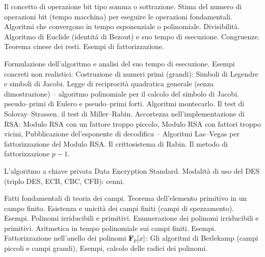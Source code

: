      
\def\abbrcorso{MA2}  
\def\titolocorso{Matematica Applicata: Laboratorio 2}
\def\sottotitolo{Crittografia a chiave pubblica} 
\def\docente{Prof. Francesco Pappalardi}  
\def\crediti{7.5}   
\def\semestre{II}
\def\esoneri{1}
\def\scrittofinale{1}
\def\oralefinale{0}
\def\altreprove{1}

\Intestazione   


Il concetto di operazione bit tipo somma o sottrazione. Stima 
del numero di operazioni bit (tempo macchina) per eseguire 
le operazioni fondamentali. Algoritmi che convergono in tempo 
esponenziale o polinomiale. Divisibilit\`a. Algoritmo di Euclide
(identit\'a di Bezout) e suo tempo di esecuzione. Congruenze. 
Teorema cinese dei resti. Esempi di fattorizzazione.


Formulazione dell'algoritmo e analisi del suo tempo di esecuzione.
Esempi concreti non realistici. Costruzione di numeri primi (grandi):
Simboli di Legendre e simboli di Jacobi.
Legge di reciprocit\`{a} quadratica generale (senza dimostrazione) --
algoritmo polinomiale per il calcolo del simbolo di Jacobi. 
pseudo--primi di Eulero e pseudo--primi forti.
Algoritmi montecarlo. Il test di Solovay--Strassen. il test di
Miller--Rabin. 
Accortezza nell'implementazione di RSA: Modulo RSA con un
fattore troppo piccolo, Modulo RSA con fattori troppo vicini,
Pubblicazione del'esponente di decodifica -- Algoritmi Las--Vegas
per fattorizzazione del Modulo RSA. Il crittosistema di Rabin.
Il metodo di fattorizzazione $p-1$.


L'algoritmo a chiave privata Data Encryption Standard. 
Modalit\`a di uso del DES (triplo DES, ECB, 
CBC, CFB): cenni.


Fatti fondamentali di teoria dei campi. Teorema dell'elemento primitivo
in un campo finito. Esistenza e unicit\`a dei campi finiti 
(campi di spezzamento). Esempi. Polinomi irriducibili e primitivi. Enumerazione dei 
polinomi irriducibili e primitivi.
 Aritmetica in tempo polinomiale sui campi finiti. Esempi.
Fattorizzazione nell'anello dei polinomi ${\bf F}_{p}[x]$: Gli algoritmi di Berlekamp 
(campi piccoli e campi grandi), Esempi, calcolo delle radici dei polinomi. 
\vfill\eject



